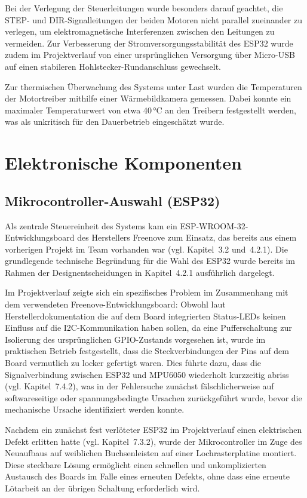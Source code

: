 \documentclass[12pt,ngerman,numbers=noenddot,abstracton,headsepline]{scrreprt}
\begin{document}
Bei der Verlegung der Steuerleitungen wurde besonders darauf geachtet, die STEP- und DIR-Signalleitungen der beiden Motoren nicht parallel zueinander zu verlegen, um elektromagnetische Interferenzen zwischen den Leitungen zu vermeiden. Zur Verbesserung der Stromversorgungsstabilität des ESP32 wurde zudem im Projektverlauf von einer ursprünglichen Versorgung über Micro-USB auf einen stabileren Hohlstecker-Rundanschluss gewechselt.

Zur thermischen Überwachung des Systems unter Last wurden die Temperaturen der Motortreiber mithilfe einer Wärmebildkamera gemessen. Dabei konnte ein maximaler Temperaturwert von etwa 40\,°C an den Treibern festgestellt werden, was als unkritisch für den Dauerbetrieb eingeschätzt wurde.

\section{Elektronische Komponenten}
\label{sec:elektronische_komponenten}

\subsection{Mikrocontroller-Auswahl (ESP32)}
\label{subsec:esp32_komponente}

Als zentrale Steuereinheit des Systems kam ein ESP-WROOM-32-Entwicklungsboard des Herstellers Freenove zum Einsatz, das bereits aus einem vorherigen Projekt im Team vorhanden war (vgl. Kapitel~3.2 und~4.2.1). Die grundlegende technische Begründung für die Wahl des ESP32 wurde bereits im Rahmen der Designentscheidungen in Kapitel~4.2.1 ausführlich dargelegt.

Im Projektverlauf zeigte sich ein spezifisches Problem im Zusammenhang mit dem verwendeten Freenove-Entwicklungsboard: Obwohl laut Herstellerdokumentation die auf dem Board integrierten Status-LEDs keinen Einfluss auf die I2C-Kommunikation haben sollen, da eine Pufferschaltung zur Isolierung des ursprünglichen GPIO-Zustands vorgesehen ist, wurde im praktischen Betrieb festgestellt, dass die Steckverbindungen der Pins auf dem Board vermutlich zu locker gefertigt waren. Dies führte dazu, dass die Signalverbindung zwischen ESP32 und MPU6050 wiederholt kurzzeitig abriss (vgl. Kapitel~7.4.2), was in der Fehlersuche zunächst fälschlicherweise auf softwareseitige oder spannungsbedingte Ursachen zurückgeführt wurde, bevor die mechanische Ursache identifiziert werden konnte.

Nachdem ein zunächst fest verlöteter ESP32 im Projektverlauf einen elektrischen Defekt erlitten hatte (vgl. Kapitel~7.3.2), wurde der Mikrocontroller im Zuge des Neuaufbaus auf weiblichen Buchsenleisten auf einer Lochrasterplatine montiert. Diese steckbare Lösung ermöglicht einen schnellen und unkomplizierten Austausch des Boards im Falle eines erneuten Defekts, ohne dass eine erneute Lötarbeit an der übrigen Schaltung erforderlich wird.
\end{document}

